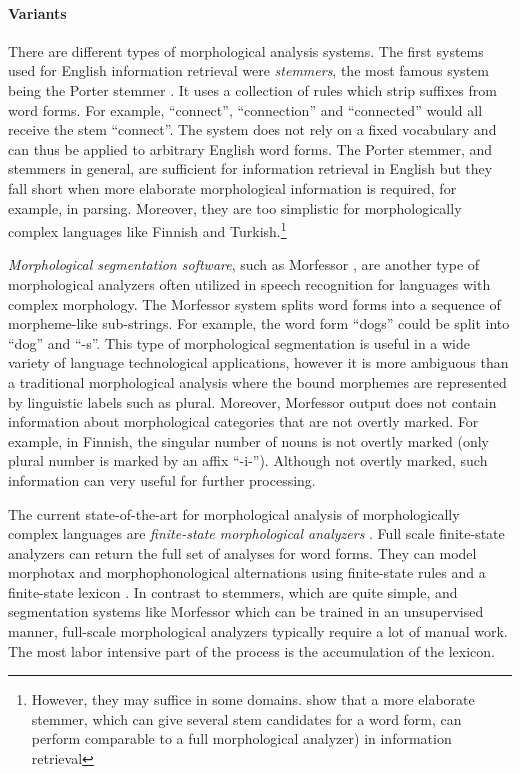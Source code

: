 \paragraph{Variants} There are different types of morphological analysis
systems. The first systems used for English information retrieval were
{\it stemmers}, the most famous system being the Porter stemmer
\citep{Porter1997}. It uses a collection of rules which strip suffixes
from word forms. For example, ``connect'', ``connection'' and
``connected'' would all receive the stem ``connect''. The system does
not rely on a fixed vocabulary and can thus be applied to arbitrary
English word forms. The Porter stemmer, and stemmers in general, are
sufficient for information retrieval in English but they fall short
when more elaborate morphological information is required, for
example, in parsing. Moreover, they are too simplistic for
morphologically complex languages like Finnish and
Turkish.\footnote{However, they may suffice in some
  domains. \cite{Kettunen2005} show that a more elaborate stemmer,
  which can give several stem candidates for a word form, can perform
  comparable to a full morphological analyzer) in information
  retrieval}

{\it Morphological segmentation software}, such as Morfessor
\citep{Creutz2002}, are another type of morphological analyzers often
utilized in speech recognition for languages with complex morphology. The
Morfessor system splits word forms into a sequence of morpheme-like
sub-strings. For example, the word form ``dogs'' could be split into
``dog'' and ``-s''.  This type of morphological segmentation is useful
in a wide variety of language technological applications, however it
is more ambiguous than a traditional morphological analysis where the
bound morphemes are represented by linguistic labels such as
plural. Moreover, Morfessor output does not contain information about
morphological categories that are not overtly marked. For example, in
Finnish, the singular number of nouns is not overtly marked (only
plural number is marked by an affix ``-i-''). Although not overtly
marked, such information can very useful for further processing.

The current state-of-the-art for morphological analysis of
morphologically complex languages are {\it finite-state morphological
  analyzers} \citep{Kaplan1994,Koskenniemi1984}. Full scale
finite-state analyzers can return the full set of analyses for word
forms. They can model morphotax and morphophonological alternations
using finite-state rules and a finite-state lexicon
\citep{Beesley2003}. In contrast to stemmers, which are quite simple,
and segmentation systems like Morfessor which can be trained in an
unsupervised manner, full-scale morphological analyzers typically
require a lot of manual work. The most labor intensive part of the
process is the accumulation of the lexicon.

